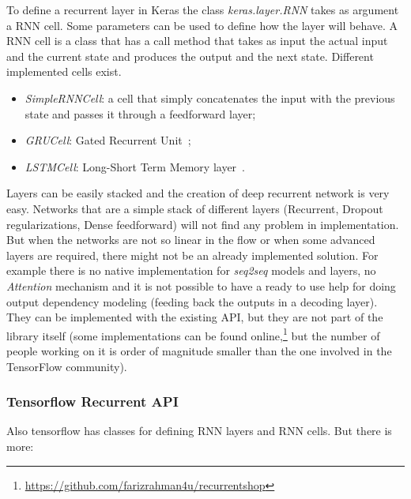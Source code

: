 To define a recurrent layer in Keras the class \textit{keras.layer.RNN} takes as argument a RNN cell. Some parameters can be used to define how the layer will behave. A RNN cell is a class that has a call method that takes as input the actual input and the current state and produces the output and the next state. Different implemented cells exist.

\begin{itemize}
	\item \textit{SimpleRNNCell}: a cell that simply concatenates the input with the previous state and passes it through a feedforward layer;

	\item \textit{GRUCell}: Gated Recurrent Unit~\cite{cho2014learning};

	\item \textit{LSTMCell}: Long-Short Term Memory layer~\cite{hochreiter1997long}.
\end{itemize}

Layers can be easily stacked and the creation of deep recurrent network is very easy. Networks that are a simple stack of different layers (Recurrent, Dropout regularizations, Dense feedforward) will not find any problem in implementation. But when the networks are not so linear in the flow or when some advanced layers are required, there might not be an already implemented solution. For example there is no native implementation for \textit{seq2seq} models and layers, no \textit{Attention} mechanism and it is not possible to have a ready to use help for doing output dependency modeling (feeding back the outputs in a decoding layer). They can be implemented with the existing API, but they are not part of the library itself (some implementations can be found online,\footnote{\url{https://github.com/farizrahman4u/recurrentshop}} but the number of people working on it is order of magnitude smaller than the one involved in the TensorFlow community).

\subsubsection{Tensorflow Recurrent API}
Also tensorflow has classes for defining RNN layers and RNN cells. But there is more:

